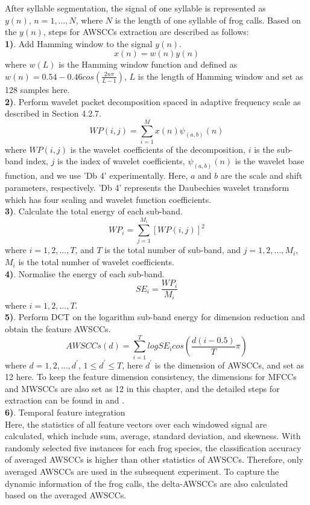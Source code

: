 After syllable segmentation, the signal of one syllable is represented as 
$y(n),\,n = 1,...,N$, where $N$ is the length of one syllable of frog calls. Based on the $y(n)$, steps for AWSCCs extraction are described as follows:\\
\textbf{1)}. Add Hamming window to the signal $y(n)$.
\begin{equation}
x(n) = w(n)y(n)
\end{equation}
\noindent where $w(L)$ is the Hamming window function and defined as $w(n)=0.54-0.46cos(\frac{2n\pi}{L-1}) $, $L$ is the length of Hamming window and set as 128 samples here.
\\
\textbf{2)}. Perform wavelet packet decomposition spaced in adaptive frequency scale as described in Section 4.2.7.
\begin{equation}
WP(i,j)=\sum_{i=1}^{M}x(n)\psi_{(a,b)}(n) 
\end{equation}
\noindent where $WP(i,j)$ is the wavelet coefficients of the decomposition, $i$ is the sub-band index, $j$ is the index of wavelet coefficients, $\psi_{(a,b)}(n)$ is the wavelet base function, and we use 'Db 4' experimentally. Here, $a$ and $b$ are the scale and shift parameters, respectively. 'Db 4' represents the Daubechies wavelet transform which has four scaling and wavelet function coefficients.
\\
\textbf{3)}. Calculate the total energy of each sub-band.
\begin{equation}
WP_{i}=\sum_{j=1}^{M_{i}}[WP(i,j)]^2
\end{equation}
\noindent where $i=1,2,...,T$, and $T$ is the total number of sub-band, and $j=1,2,...,M_{i}$, $M_{i}$ is the total number of wavelet coefficients.
\\
\textbf{4)}. Normalise the energy of each sub-band.
\begin{equation}
SE_{i}=\frac{WP_{i}}{M_{i}}
\end{equation}
\noindent where $i=1,2,...,T$.
\\
\textbf{5)}. Perform DCT on the logarithm sub-band energy for dimension reduction and obtain the feature AWSCCs.
\begin{equation}
AWSCCs(d)=\sum_{i=1}^{T}logSE_{i}cos(\frac{d(i-0.5)}{T}\pi)
\end{equation}
\noindent where $d=1,2,...,d^{'}$, $1 \leq d^{'} \leq T$, here $d^{'}$ is the dimension of AWSCCs, and set as 12 here. To keep the feature dimension consistency, the dimensions for MFCCs and MWSCCs are also set as 12 in this chapter, and the detailed steps for extraction can be found in \citep{bedoya2014automatic} and \citep{Zhang2015108}.
\\
\textbf{6)}. Temporal feature integration
\\
Here, the statistics of all feature vectors over each windowed signal are calculated, which include sum, average, standard deviation, and skewness. With randomly selected five instances for each frog species, the classification accuracy of averaged AWSCCs is higher than other statistics of AWSCCs. Therefore, only averaged AWSCCs are used in the subsequent experiment. To capture the dynamic information of the frog calls, the delta-AWSCCs are also calculated based on the averaged AWSCCs. 




